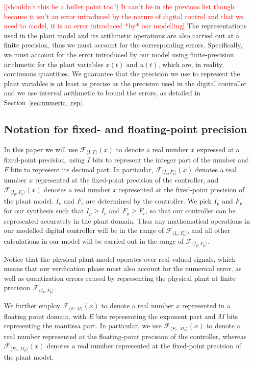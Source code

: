 \documentclass[twocolumn]{autart}    %
\renewcommand{\note}[1]{\textcolor{red}{[#1]}}
\begin{document}
\note{[shouldn't this be a bullet point too?] It can't be in the previous list though because ti isn't an error introduced by the nature of digital control and that we need to model, it is an error introduced *by* our modelling}
The representations used in the plant model and its arithmetic operations are also carried out at a finite precision, 
thus we must account for the corresponding errors.  
Specifically, we must account for the error introduced by our model using finite-precision arithmetic for the plant variables $x(t)$ and $u(t)$, which are, in reality, continuous quantities. 
We guarantee that the precision we use to represent the plant variables is at least as precise as the precision used in the digital controller and we use interval arithmetic to bound the errors, as detailed in Section~\ref{sec:numeric_rep}. 

\subsection{Notation for fixed- and floating-point precision}  

In this paper we will use $\mathcal{F}_{\langle I,F \rangle}(x)$ to denote a real number $x$ expressed at a fixed-point precision, 
using $I$ bits to represent the integer part of the number and $F$ bits to represent its decimal part.  
In particular, $\mathcal{F}_{\langle I_c,F_c \rangle}(x)$ denotes a real number $x$ represented at the fixed-point precision of the controller, 
and $\mathcal{F}_{\langle I_p,F_p \rangle}(x)$ denotes a real number $x$
represented at the fixed-point precision of the plant model. 
$I_c$ and $F_c$ are determined by the controller.  We pick $I_p$ and $F_p$ for our synthesis
such that $I_p \geq I_c$ and $\allowbreak F_p \geq F_c$, so that our controller 
can be represented accurately in the plant domain.    
Thus any mathematical operations in our modelled digital controller will be in the
range of $\mathcal{F}_{\langle I_c,F_c \rangle}$, and all other calculations
in our model will be carried out in the range of $\mathcal{F}_{\langle
I_p,F_p \rangle}$.  

Notice that the physical plant model operates over real-valued signals, 
which means that our verification phase must also account for the numerical error, 
as well as quantization errors caused by representing the physical plant at finite 
precision $\mathcal{F}_{\langle I_p,F_p \rangle}$. 
 
We further employ $\mathcal{F}_{\langle E,M \rangle}(x)$ to denote a real number $x$ represented in a floating point domain, 
with $E$ bits representing the exponent part and $M$ bits representing the mantissa part. 
In particular, 
we use $\mathcal{F}_{\langle E_c,M_c \rangle}(x)$ to denote a real number 
represented at the floating-point precision of the controller, 
whereas $\mathcal{F}_{\langle E_p,M_p \rangle}(x)$ denotes a real number represented at the fixed-point precision of the plant model.  
\end{document}
